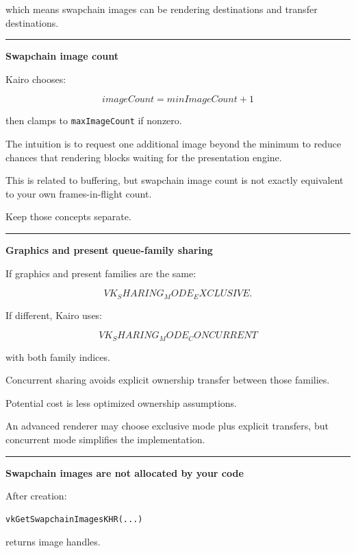 which means swapchain images can be rendering destinations and transfer destinations.

\begin{center}\rule{0.5\linewidth}{0.5pt}\end{center}

\textbf{Swapchain image count}

Kairo chooses:

\[
imageCount=
minImageCount+1
\]

then clamps to \texttt{maxImageCount} if nonzero.

The intuition is to request one additional image beyond the minimum to reduce chances that rendering blocks waiting for the presentation engine.

This is related to buffering, but swapchain image count is not exactly equivalent to your own frames-in-flight count.

Keep those concepts separate.

\begin{center}\rule{0.5\linewidth}{0.5pt}\end{center}

\textbf{Graphics and present queue-family sharing}

If graphics and present families are the same:

\[
VK_SHARING_MODE_EXCLUSIVE.
\]

If different, Kairo uses:

\[
VK_SHARING_MODE_CONCURRENT
\]

with both family indices.

Concurrent sharing avoids explicit ownership transfer between those families.

Potential cost is less optimized ownership assumptions.

An advanced renderer may choose exclusive mode plus explicit transfers, but concurrent mode simplifies the implementation.

\begin{center}\rule{0.5\linewidth}{0.5pt}\end{center}

\textbf{Swapchain images are not allocated by your code}

After creation:

\begin{verbatim}
vkGetSwapchainImagesKHR(...)
\end{verbatim}

returns image handles.

